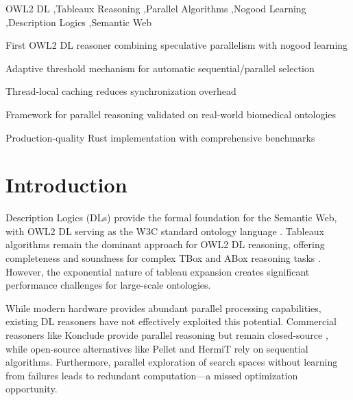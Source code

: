 \documentclass[preprint,12pt]{elsarticle}
\begin{document}
\begin{frontmatter}
\begin{keyword}
OWL2 DL \sep Tableaux Reasoning \sep Parallel Algorithms \sep Nogood Learning \sep Description Logics \sep Semantic Web
\end{keyword}

\end{frontmatter}

\begin{highlights}
\item First OWL2 DL reasoner combining speculative parallelism with nogood learning
\item Adaptive threshold mechanism for automatic sequential/parallel selection
\item Thread-local caching reduces synchronization overhead
\item Framework for parallel reasoning validated on real-world biomedical ontologies
\item Production-quality Rust implementation with comprehensive benchmarks
\end{highlights}


\section{Introduction}
\label{sec:intro}

Description Logics (DLs) provide the formal foundation for the Semantic Web, with OWL2 DL serving as the W3C standard ontology language \cite{owl2}. Tableaux algorithms remain the dominant approach for OWL2 DL reasoning, offering completeness and soundness for complex TBox and ABox reasoning tasks \cite{dlhandbook}. However, the exponential nature of tableau expansion creates significant performance challenges for large-scale ontologies.

While modern hardware provides abundant parallel processing capabilities, existing DL reasoners have not effectively exploited this potential. Commercial reasoners like Konclude provide parallel reasoning but remain closed-source \cite{konclude}, while open-source alternatives like Pellet \cite{pellet} and HermiT \cite{hermit} rely on sequential algorithms. Furthermore, parallel exploration of search spaces without learning from failures leads to redundant computation---a missed optimization opportunity.
\end{document}
